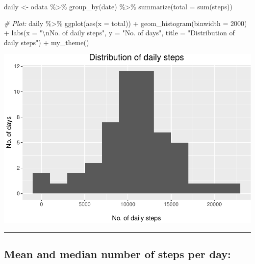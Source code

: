\documentclass[
  paper=a4,
  ,captions=tableheading
]{scrartcl}
\newenvironment{Shaded}{\begin{snugshade}}{\end{snugshade}}
\newcommand{\AttributeTok}[1]{\textcolor[rgb]{0.77,0.63,0.00}{#1}}
\newcommand{\CommentTok}[1]{\textcolor[rgb]{0.56,0.35,0.01}{\textit{#1}}}
\newcommand{\ConstantTok}[1]{\textcolor[rgb]{0.00,0.00,0.00}{#1}}
\newcommand{\DecValTok}[1]{\textcolor[rgb]{0.00,0.00,0.81}{#1}}
\newcommand{\FunctionTok}[1]{\textcolor[rgb]{0.00,0.00,0.00}{#1}}
\newcommand{\NormalTok}[1]{#1}
\newcommand{\OtherTok}[1]{\textcolor[rgb]{0.56,0.35,0.01}{#1}}
\newcommand{\SpecialCharTok}[1]{\textcolor[rgb]{0.00,0.00,0.00}{#1}}
\newcommand{\StringTok}[1]{\textcolor[rgb]{0.31,0.60,0.02}{#1}}
\begin{document}
\begin{Shaded}
\begin{Highlighting}[]
\NormalTok{daily }\OtherTok{\textless{}{-}}\NormalTok{ odata }\SpecialCharTok{\%\textgreater{}\%}
    \FunctionTok{group\_by}\NormalTok{(date) }\SpecialCharTok{\%\textgreater{}\%} 
    \FunctionTok{summarize}\NormalTok{(}\AttributeTok{total =} \FunctionTok{sum}\NormalTok{(steps))}

\CommentTok{\# Plot:}
\NormalTok{daily }\SpecialCharTok{\%\textgreater{}\%}
  \FunctionTok{ggplot}\NormalTok{(}\FunctionTok{aes}\NormalTok{(}\AttributeTok{x =}\NormalTok{ total)) }\SpecialCharTok{+}
  \FunctionTok{geom\_histogram}\NormalTok{(}\AttributeTok{binwidth =} \DecValTok{2000}\NormalTok{) }\SpecialCharTok{+}
  \FunctionTok{labs}\NormalTok{(}\AttributeTok{x =} \StringTok{"}\SpecialCharTok{\textbackslash{}n}\StringTok{No. of daily steps"}\NormalTok{,}
       \AttributeTok{y =} \StringTok{"No. of days"}\NormalTok{,}
       \AttributeTok{title =} \StringTok{"Distribution of daily steps"}\NormalTok{) }\SpecialCharTok{+} 
  \FunctionTok{my\_theme}\NormalTok{()}
\end{Highlighting}
\end{Shaded}

\begin{center}\includegraphics[width=0.6\linewidth]{PA1_template_files/figure-latex/histo-1} \end{center}

\begin{center}\rule{0.5\linewidth}{0.5pt}\end{center}

\hypertarget{mean-and-median-number-of-steps-per-day}{%
\subsection{Mean and median number of steps per
day:}\label{mean-and-median-number-of-steps-per-day}}

\begin{Shaded}
\end{Shaded}
\end{document}
